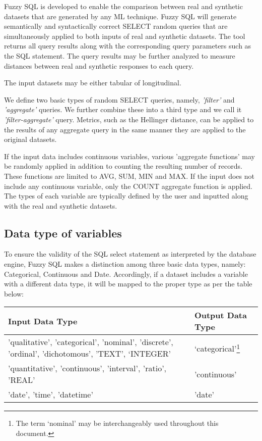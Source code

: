 Fuzzy SQL is developed to enable the comparison between real and
synthetic datasets that are generated by any ML technique. Fuzzy SQL
will generate semantically and syntactically correct SELECT random
queries that are simultaneously applied to both inputs of real and
synthetic datasets. The tool returns all query results along with the
corresponding query parameters such as the SQL statement. The query
results may be further analyzed to measure distances between real and
synthetic responses to each query.

The input datasets may be either tabular of longitudinal.

We define two basic types of random SELECT queries, namely,
\emph{'filter'} and \emph{'aggregate'} queries. We further combine these
into a third type and we call it \emph{'filter-aggregate'} query.
Metrics, such as the Hellinger distance, can be applied to the results
of any aggregate query in the same manner they are applied to the
original datasets.

If the input data includes continuous variables, various 'aggregate
functions' may be randomly applied in addition to counting the resulting
number of records. These functions are limited to AVG, SUM, MIN and MAX.
If the input does not include any continuous variable, only the COUNT
aggregate function is applied. The types of each variable are typically
defined by the user and inputted along with the real and synthetic
datasets.

\hypertarget{data-type-of-variables}{%
\subsection{Data type of variables}\label{data-type-of-variables}}

To ensure the validity of the SQL select statement as interpreted by the
database engine, Fuzzy SQL makes a distinction among three basic data
types, namely: Categorical, Continuous and Date. Accordingly, if a
dataset includes a variable with a different data type, it will be
mapped to the proper type as per the table below:

\begin{longtable}[]{@{}ll@{}}
\toprule
Input Data Type & Output Data Type\tabularnewline
\midrule
\endhead
'qualitative', 'categorical', 'nominal', 'discrete', 'ordinal',
'dichotomous', 'TEXT', `INTEGER' & `categorical'\footnote{The term
  `nominal' may be interchangeably used throughout this document.}\tabularnewline
'quantitative', 'continuous', 'interval', 'ratio', 'REAL' &
'continuous'\tabularnewline
'date', 'time', 'datetime' & 'date'\tabularnewline
\bottomrule
\end{longtable}

